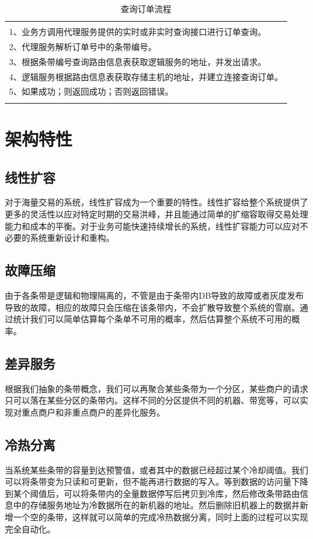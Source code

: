 \documentclass[letterpaper,twocolumn,10pt]{article}
\begin{document}
\begin{table}[htp]
\caption{查询订单流程}
\begin{center}
\begin{tabular}{l}
\hline
\\
1、业务方调用代理服务提供的实时或非实时查询接口进行订单查询。\\
2、代理服务解析订单号中的条带编号。 \\
3、根据条带编号查询路由信息表获取逻辑服务的地址，并发出请求。 \\
4、逻辑服务根据路由信息表获取存储主机的地址，并建立连接查询订单。\\
5、如果成功；则返回成功；否则返回错误。\\
\\
\hline
\end{tabular}
\end{center}
\label{query}
\end{table}%

\section {架构特性}
\subsection {线性扩容}
对于海量交易的系统，线性扩容成为一个重要的特性。线性扩容给整个系统提供了更多的灵活性以应对特定时期的交易洪峰，并且能通过简单的扩缩容取得交易处理能力和成本的平衡。对于业务可能快速持续增长的系统，线性扩容能力可以应对不必要的系统重新设计和重构。

\subsection {故障压缩}
由于各条带是逻辑和物理隔离的，不管是由于条带内DB导致的故障或者灰度发布导致的故障，相应的故障只会压缩在该条带内，不会扩散导致整个系统的雪崩。通过统计我们可以简单估算每个条单不可用的概率，然后估算整个系统不可用的概率。

\subsection {差异服务}
根据我们抽象的条带概念，我们可以再聚合某些条带为一个分区，某些商户的请求只可以落在某些分区的条带内。这样不同的分区提供不同的机器、带宽等，可以实现对重点商户和非重点商户的差异化服务。

\subsection {冷热分离}
当系统某些条带的容量到达预警值，或者其中的数据已经超过某个冷却阈值。我们可以将条带变为只读和可更新，但不能再进行数据的写入。等到数据的访问量下降到某个阈值后，可以将条带内的全量数据停写后拷贝到冷库，然后修改条带路由信息中的存储服务地址为冷数据所在的新机器的地址。然后删除旧机器上的数据并新增一个空的条带，这样就可以简单的完成冷热数据分离，同时上面的过程可以实现完全自动化。
\end{document}
